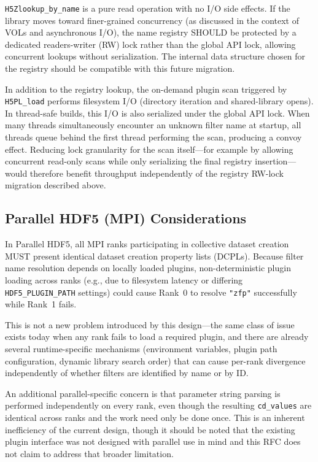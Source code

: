 \documentclass[../HDF5_RFC.tex]{subfiles}
\begin{document}
\texttt{H5Zlookup\_by\_name} is a pure read operation with
no I/O side effects. If the library moves toward finer-grained concurrency
(as discussed in the context of VOLs and asynchronous I/O), the name registry
SHOULD be protected by a dedicated readers-writer (RW) lock rather than the
global API lock, allowing concurrent lookups without serialization. The
internal data structure chosen for the registry should be compatible with this
future migration.

In addition to the registry lookup, the on-demand plugin scan triggered by
\texttt{H5PL\_load} performs filesystem I/O (directory iteration and shared-library
opens). In thread-safe builds, this I/O is also serialized under the global
API lock. When many threads simultaneously encounter an unknown filter name at
startup, all threads queue behind the first thread performing the scan,
producing a convoy effect. Reducing lock granularity for the scan itself---for
example by allowing concurrent read-only scans while only serializing the
final registry insertion---would therefore benefit throughput independently of
the registry RW-lock migration described above.

\subsection{Parallel HDF5 (MPI) Considerations}

In Parallel HDF5, all MPI ranks participating in collective dataset creation
MUST present identical dataset creation property lists (DCPLs). Because filter
name resolution depends on locally loaded plugins, non-deterministic plugin
loading across ranks (e.g., due to filesystem latency or differing
\texttt{HDF5\_PLUGIN\_PATH} settings) could cause Rank~0 to resolve \texttt{"zfp"}
successfully while Rank~1 fails.

This is not a new problem introduced by this design---the same class of
issue exists today when any rank fails to load a required plugin, and there
are already several runtime-specific mechanisms (environment variables,
plugin path configuration, dynamic library search order) that can cause
per-rank divergence independently of whether filters are identified by name
or by ID.

An additional parallel-specific concern is that parameter string parsing is
performed independently on every rank, even though the resulting
\texttt{cd\_values} are identical across ranks and the work need only be done
once.  This is an inherent inefficiency of the current design, though it
should be noted that the existing plugin interface was not designed with
parallel use in mind and this RFC does not claim to address that broader
limitation.
\end{document}
